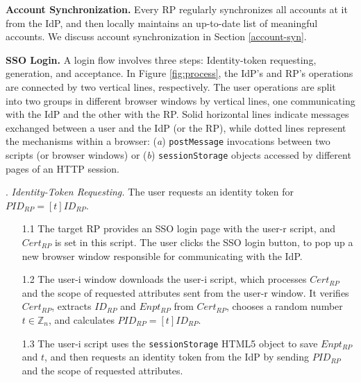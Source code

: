 \noindent\textbf{Account Synchronization.} 
Every RP regularly synchronizes all accounts at it from the IdP,
    and then locally maintains an up-to-date list of meaningful accounts.
We discuss account synchronization in Section \ref{account-syn}.


\noindent\textbf{SSO Login.} 
A login flow %
involves three steps: Identity-token requesting, generation, and acceptance.
In Figure \ref{fig:process}, the IdP's and RP's operations are connected by two vertical lines, respectively. The user operations are split into two groups in different browser windows by vertical lines, one communicating with the IdP and the other with the RP. Solid horizontal lines indicate messages exchanged between a user and the IdP (or the RP), while dotted lines represent the mechanisms within a browser:
(\emph{a}) \verb+postMessage+ invocations between two scripts (or browser windows)
or (\emph{b}) \verb+sessionStorage+ objects accessed by different pages of an HTTP session.


. {\em Identity-Token Requesting.}
The user requests an identity token for $PID_{RP} = [t]{ID_{RP}}$.
\begin{itemize}
\setlength{\topsep}{0pt}
\setlength{\partopsep}{0pt}
\setlength{\itemsep}{0pt}
\setlength{\parsep}{0pt}
\setlength{\parskip}{0pt}
\item[1.1]
The target RP provides an SSO login page with the user-r script,
    and $Cert_{RP}$ is set in this script.
The user clicks the SSO login button,
    to pop up a new browser window responsible for communicating with the IdP.
\item[1.2] The user-i window downloads the user-i script,
which processes $Cert_{RP}$ and the scope of requested attributes sent from the user-r window.
It verifies $Cert_{RP}$, extracts $ID_{RP}$ and $Enpt_{RP}$ from $Cert_{RP}$, 
chooses a random number $t \in \mathbb{Z}_n$,
    and calculates $PID_{RP}=[t]{ID_{RP}}$.
\item[1.3] 
The user-i script uses the \verb+sessionStorage+ HTML5 object to save $Enpt_{RP}$ and $t$,
    and then requests an identity token from the IdP by sending $PID_{RP}$ and the scope of requested attributes.
\end{itemize}


